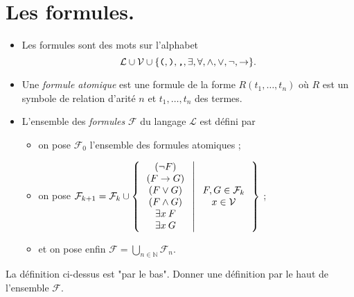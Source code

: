 \documentclass[./main]{subfiles}
\begin{document}
  \section{Les formules.}

  \begin{defn}
    \begin{itemize}
      \item Les formules sont des mots sur l'alphabet \[ \mathcal{L} \cup \mathcal{V} \cup \{\verb|(|, \verb|)|, \verb|,|, \exists, \forall, \land, \lor, \lnot, \to \} .\] 
      \item Une \textit{formule atomique} est une formule de la forme $R(t_1, \ldots, t_n)$ où $R$ est un symbole de relation d'arité $n$ et $t_1, \ldots, t_n$ des termes.
      \item L'ensemble des \textit{formules} $\mathcal{F}$ du langage $\mathcal{L}$ est défini par 
        \begin{itemize}
          \item on pose $\mathcal{F}_0$ l'ensemble des formules atomiques ;
          \item on pose $\mathcal{F}_{k+1} = \mathcal{F}_k \cup \mleft\{\,
              \begin{array}{c}
                (\lnot F)\\
                (F \to G)\\
                (F \lor G)\\
                (F \land G)\\
                \exists x\: F\\
                \exists x\: G\\
              \end{array}
            \;\middle|\; 
            \begin{array}{c}
              F,G \in \mathcal{F}_k\\
              x \in \mathcal{V}
            \end{array}
          \,\mright\}$ ;
        \item et on pose enfin $\mathcal{F} = \bigcup_{n \in \mathds{N}} \mathcal{F}_n$.
        \end{itemize}
    \end{itemize}
  \end{defn}

  \begin{exo}
    La définition ci-dessus est "par le bas". Donner une définition par le haut de l'ensemble $\mathcal{F}$.
  \end{exo}
\end{document}
